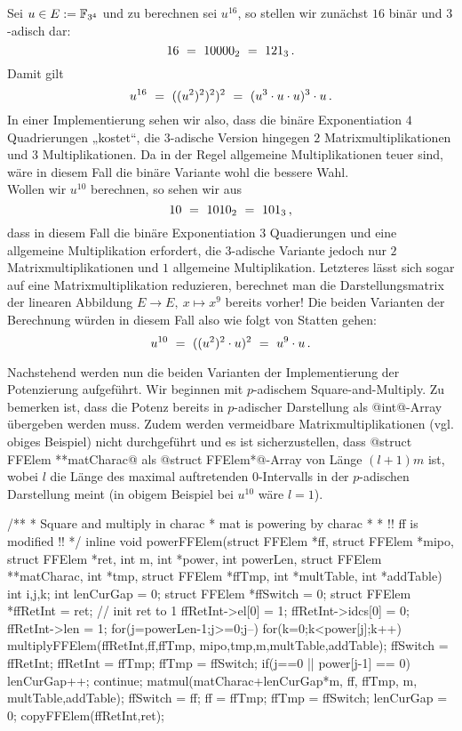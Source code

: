 \begin{beispiel}
  Sei $u \in E := \mathbb{F}_{3^4}$ und zu berechnen sei $u^{16}$, so stellen wir zunächst
  $16$ binär und $3$-adisch dar:
  \[ 16 \ =\  10000_2 \ =\  121_3 \,.\]
  Damit gilt
  \[ u^{16} \ =\  ((u^2)^2)^2)^2 \ =\  (u^3\cdot u\cdot u)^3\cdot u\,.\]
  In einer Implementierung sehen wir also, dass die binäre Exponentiation 
  $4$ Quadrierungen „kostet“, die $3$-adische Version 
  hingegen $2$ Matrixmultiplikationen und $3$ Multiplikationen.
  Da in der Regel allgemeine Multiplikationen teuer sind, wäre in diesem Fall
  die binäre Variante wohl die bessere Wahl.\\
  Wollen wir $u^{10}$ berechnen, so sehen wir aus
  \[ 10 \ =\  1010_2 \ =\  101_3\,,\]
  dass in diesem Fall die binäre Exponentiation $3$ Quadierungen und eine
  allgemeine Multiplikation erfordert, die $3$-adische Variante jedoch nur 
  $2$ Matrixmultiplikationen und $1$ allgemeine Multiplikation. Letzteres lässt
  sich sogar auf eine Matrixmultiplikation reduzieren, berechnet man die
  Darstellungsmatrix der linearen Abbildung $E\to E,\ x\mapsto x^9$ bereits
  vorher! Die beiden Varianten der Berechnung würden 
  in diesem Fall also wie folgt von Statten gehen:
  \[ u^{10} \ =\  ((u^2)^2\cdot u)^2 \ =\  u^9\cdot u\,.\]
\end{beispiel}

Nachstehend werden nun die beiden Varianten der Implementierung der Potenzierung
aufgeführt. Wir beginnen mit $p$-adischem Square-and-Multiply. Zu bemerken ist,
dass die Potenz bereits in $p$-adischer Darstellung als @int@-Array übergeben
werden muss. Zudem werden vermeidbare Matrixmultiplikationen (vgl. obiges
Beispiel) nicht durchgeführt und es ist sicherzustellen, 
dass @struct FFElem **matCharac@ als @struct FFElem*@-Array
von Länge $(l+1)m$ ist, wobei $l$ die Länge
des maximal auftretenden $0$-Intervalls in der $p$-adischen Darstellung meint 
(in obigem Beispiel bei $u^{10}$ wäre $l=1$).


\begin{ccode}[caption={[\texttt{void powerFFElem} aus 
 \url{../Sage/enumeratePCNs.c}]Aus \url{../Sage/enumeratePCNs.c}},
  label=lst:powerffelem]
/**
 * Square and multiply in charac
 * mat is powering by charac
 *
 * !! ff is modified !!
 */
inline void powerFFElem(struct FFElem *ff, struct FFElem *mipo,
        struct FFElem *ret, 
        int m, int *power, int powerLen,
        struct FFElem **matCharac, int *tmp, struct FFElem *ffTmp,
        int *multTable, int *addTable){
    int i,j,k;
    int lenCurGap = 0;
    struct FFElem *ffSwitch = 0;
    struct FFElem *ffRetInt = ret;
    // init ret to 1
    ffRetInt->el[0] = 1; ffRetInt->idcs[0] = 0; ffRetInt->len = 1;
    for(j=powerLen-1;j>=0;j--){
        for(k=0;k<power[j];k++){
            multiplyFFElem(ffRetInt,ff,ffTmp, mipo,tmp,m,multTable,addTable);
            ffSwitch = ffRetInt; ffRetInt = ffTmp; ffTmp = ffSwitch;
        }
        if(j==0 || power[j-1] == 0){
            lenCurGap++;
            continue;
        }
        matmul(matCharac+lenCurGap*m, ff, ffTmp, m, multTable,addTable);
        ffSwitch = ff; ff = ffTmp; ffTmp = ffSwitch;
        lenCurGap = 0;
    }
    copyFFElem(ffRetInt,ret);
}
\end{ccode}


